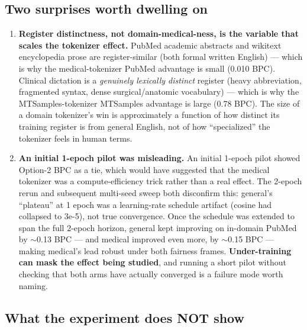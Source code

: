 \documentclass[11pt]{article}
\begin{document}
\subsection*{Two surprises worth dwelling on}

\begin{enumerate}[leftmargin=*]
    \item \textbf{Register distinctness, not domain-medical-ness, is the variable that scales the tokenizer effect.} PubMed academic abstracts and wikitext encyclopedia prose are register-similar (both formal written English) --- which is why the medical-tokenizer PubMed advantage is small (0.010 BPC). Clinical dictation is a \emph{genuinely lexically distinct} register (heavy abbreviation, fragmented syntax, dense surgical/anatomic vocabulary) --- which is why the MTSamples-tokenizer MTSamples advantage is large (0.78 BPC). The size of a domain tokenizer's win is approximately a function of how distinct its training register is from general English, not of how ``specialized'' the tokenizer feels in human terms.

    \item \textbf{An initial 1-epoch pilot was misleading.} An initial 1-epoch pilot showed Option-2 BPC as a tie, which would have suggested that the medical tokenizer was a compute-efficiency trick rather than a real effect. The 2-epoch rerun and subsequent multi-seed sweep both disconfirm this: general's ``plateau'' at 1 epoch was a learning-rate schedule artifact (cosine had collapsed to 3e-5), not true convergence. Once the schedule was extended to span the full 2-epoch horizon, general kept improving on in-domain PubMed by $\sim$0.13 BPC --- and medical improved even more, by $\sim$0.15 BPC --- making medical's lead robust under both fairness frames. \textbf{Under-training can mask the effect being studied}, and running a short pilot without checking that both arms have actually converged is a failure mode worth naming.
\end{enumerate}

\subsection*{What the experiment does NOT show}
\end{document}
